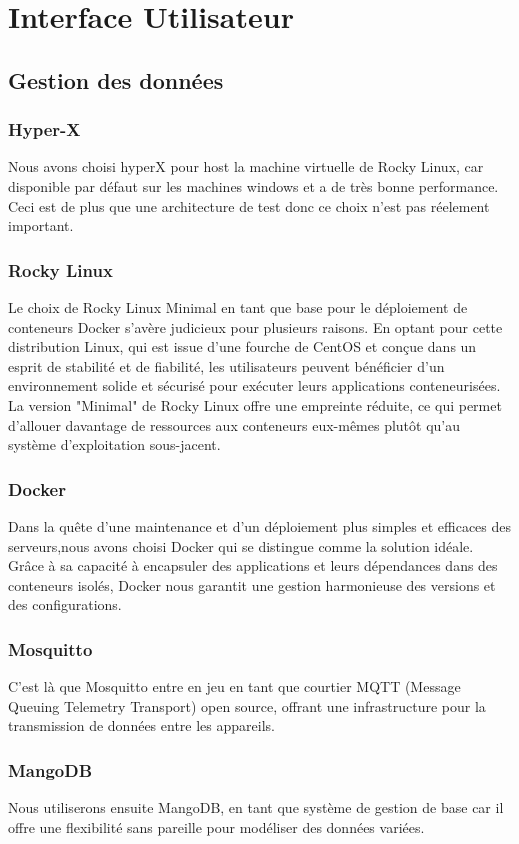 \chapter{Interface Utilisateur}
\section{Gestion des données}
\subsection{Hyper-X}
Nous avons choisi hyperX pour host la machine virtuelle de Rocky Linux, car disponible par défaut sur les machines windows et a de très bonne performance. Ceci est de plus que une architecture de test donc ce choix n'est pas réelement important.
\subsection{Rocky Linux}
Le choix de Rocky Linux Minimal en tant que base pour le déploiement de conteneurs Docker s'avère judicieux pour plusieurs raisons. En optant pour cette distribution Linux, qui est issue d'une fourche de CentOS et conçue dans un esprit de stabilité et de fiabilité, les utilisateurs peuvent bénéficier d'un environnement solide et sécurisé pour exécuter leurs applications conteneurisées. La version "Minimal" de Rocky Linux offre une empreinte réduite, ce qui permet d'allouer davantage de ressources aux conteneurs eux-mêmes plutôt qu'au système d'exploitation sous-jacent.
\subsection{Docker}
Dans la quête d'une maintenance et d'un déploiement plus simples et efficaces des serveurs,nous avons choisi Docker qui se distingue comme la solution idéale. Grâce à sa capacité à encapsuler des applications et leurs dépendances dans des conteneurs isolés, Docker nous garantit une gestion harmonieuse des versions et des configurations.
\subsection{Mosquitto}
C'est là que Mosquitto entre en jeu en tant que courtier MQTT (Message Queuing Telemetry Transport) open source, offrant une infrastructure pour la transmission de données entre les appareils.
\subsection{MangoDB}
Nous utiliserons ensuite MangoDB, en tant que système de gestion de base car il offre une flexibilité sans pareille pour modéliser des données variées.
